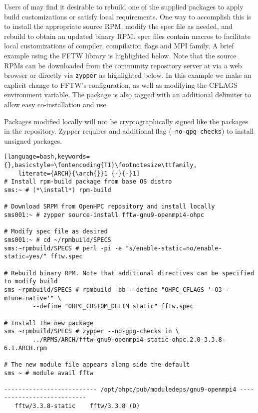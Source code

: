 Users of \OHPC{} may find it desirable to rebuild one of the supplied packages
to apply build customizations or satisfy local requirements. One way to
accomplish this is to install the appropriate source RPM, modify the spec file
as needed, and rebuild to obtain an updated binary RPM. \OHPC{} spec files
contain macros to facilitate local customizations of compiler, compilation
flags and MPI family. A brief example using
the FFTW library is highlighted below.  Note that the source RPMs can be downloaded from the
community repository server at \href{http://repos.openhpc.community}
{\color{blue}{http://repos.openhpc.community}} via a web browser or directly
via \texttt{zypper} as highlighted below. In this example we make an explicit
change to FFTW's configuration, as well as modifying the CFLAGS environment
variable. The package is also tagged with an additional delimiter to allow easy
co-installation and use.

\begin{center}
\begin{tcolorbox}[]
\small
Packages modified locally will not be cryptographically signed like the packages
    in the \OHPC{} repository. Zypper requires and additional flag
    (\texttt{--no-gpg-checks}) to install unsigned packages.
\end{tcolorbox}
\end{center}

\begin{lstlisting}[language=bash,keywords={},basicstyle=\fontencoding{T1}\footnotesize\ttfamily,
    literate={ARCH}{\arch{}}1 {-}{-}1]
# Install rpm-build package from base OS distro
sms:~ # (*\install*) rpm-build

# Download SRPM from OpenHPC repository and install locally
sms001:~ # zypper source-install fftw-gnu9-openmpi4-ohpc

# Modify spec file as desired
sms001:~ # cd ~/rpmbuild/SPECS
sms:~rpmbuild/SPECS # perl -pi -e "s/enable-static=no/enable-static=yes/" fftw.spec

# Rebuild binary RPM. Note that additional directives can be specified to modify build
sms ~rpmbuild/SPECS # rpmbuild -bb --define "OHPC_CFLAGS '-O3 -mtune=native'" \
        --define "OHPC_CUSTOM_DELIM static" fftw.spec

# Install the new package
sms ~rpmbuild/SPECS # zypper --no-gpg-checks in \
        ../RPMS/ARCH/fftw-gnu9-openmpi4-static-ohpc.2.0-3.3.8-6.1.ARCH.rpm

# The new module file appears along side the default
sms ~ # module avail fftw

-------------------------- /opt/ohpc/pub/moduledeps/gnu9-openmpi4 ---------------------------
   fftw/3.3.8-static    fftw/3.3.8 (D)
\end{lstlisting}
